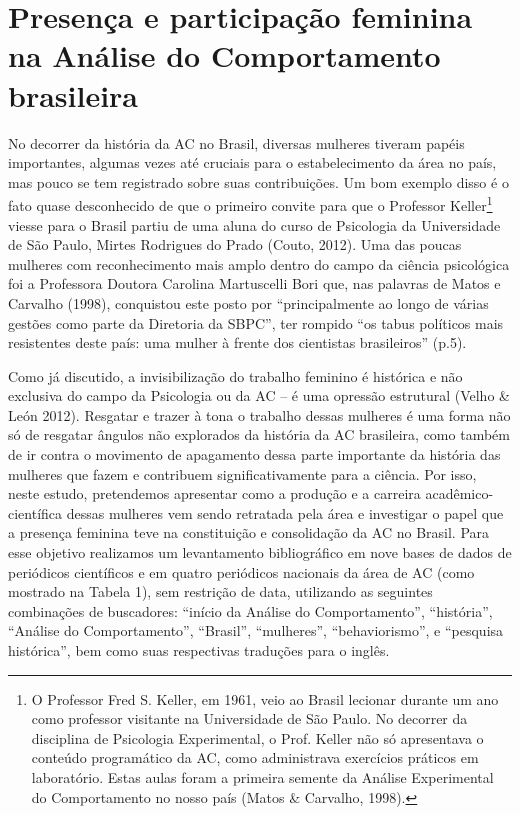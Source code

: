 \section{Presença e participação feminina na Análise do Comportamento brasileira}

No decorrer da história da AC no Brasil, diversas mulheres tiveram papéis importantes, algumas vezes até cruciais para o estabelecimento da área no país, mas pouco se tem registrado sobre suas contribuições. Um bom exemplo disso é o fato quase desconhecido de que o primeiro convite para que o Professor Keller\footnote{O Professor Fred S. Keller, em 1961, veio ao Brasil lecionar durante um ano como professor visitante na Universidade de São Paulo. No decorrer da disciplina de Psicologia Experimental, o Prof. Keller não só apresentava o conteúdo programático da AC, como administrava exercícios práticos em laboratório. Estas aulas foram a primeira semente da Análise Experimental do Comportamento no nosso país (Matos \& Carvalho, 1998).} viesse para o Brasil partiu de uma aluna do curso de Psicologia da Universidade de São Paulo, Mirtes Rodrigues do Prado (Couto, 2012). Uma das poucas mulheres com reconhecimento mais amplo dentro do campo da ciência psicológica foi a Professora Doutora Carolina Martuscelli Bori que, nas palavras de Matos e Carvalho (1998), conquistou este posto por “principalmente ao longo de várias gestões como parte da Diretoria da SBPC”, ter rompido “os tabus políticos mais resistentes deste país: uma mulher à frente dos cientistas brasileiros” (p.5).

Como já discutido, a invisibilização do trabalho feminino é histórica e não exclusiva do campo da Psicologia ou da AC – é uma opressão estrutural (Velho \& León 2012). Resgatar e trazer à tona o trabalho dessas mulheres é uma forma não só de resgatar ângulos não explorados da história da AC brasileira, como também de ir contra o movimento de apagamento dessa parte importante da história das mulheres que fazem e contribuem significativamente para a ciência. Por isso, neste estudo, pretendemos apresentar como a produção e a carreira acadêmico-científica dessas mulheres vem sendo retratada pela área e investigar o papel que a presença feminina teve na constituição e consolidação da AC no Brasil. Para esse objetivo realizamos um levantamento bibliográfico em nove bases de dados de periódicos científicos e em quatro periódicos nacionais da área de AC (como mostrado na Tabela 1), sem restrição de data, utilizando as seguintes combinações de buscadores: “início da Análise do Comportamento”, “história”, “Análise do Comportamento”, “Brasil”, “mulheres”, “behaviorismo”, e “pesquisa histórica”, bem como suas respectivas traduções para o inglês.

